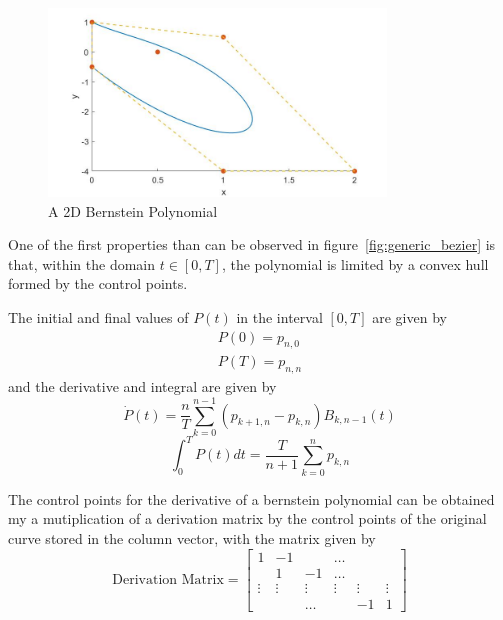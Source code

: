 \begin{figure}[h!]
\centering
\includegraphics[width=0.8\textwidth]{Images/generic_bezier2D_reordered.jpg}
\caption{A 2D Bernstein Polynomial}
\label{fig:generic_bezier2D_reordered}
\end{figure}


\par One of the first properties than can be observed in figure~\ref{fig:generic_bezier} is that, within the domain $t \in [0,T]$, the polynomial is limited by a convex hull formed by the control points.

\par The initial and final values of $P(t)$ in the interval $[0,T]$ are given by
\begin{equation}
    \label{eq:bern_in_fin}
    \begin{gathered}
        P(0) = p_{n,0} \\
        P(T) = p_{n,n}
    \end{gathered}
\end{equation}
and the derivative and integral are given by 
\begin{equation}
    \label{eq:bern_deriv}
    \dot{P}(t) = \frac{n}{T} \sum_{k=0}^{n-1} (p_{k+1,n} - p_{k,n}) B_{k,n-1}(t)
\end{equation}
\begin{equation}
    \label{eq:bern_int}
    \int_0^T P(t)dt = \frac{T}{n+1} \sum_{k=0}^{n} p_{k,n}
\end{equation}

\par The control points for the derivative of a bernstein polynomial can be obtained my a mutiplication of a derivation matrix by the control points of the original curve stored in the column vector, with the matrix given by 
\begin{equation}
    \text{Derivation Matrix} = 
    \begin{bmatrix}
        1 & -1 & & \ldots & & \\
        & 1 & -1 & \ldots & & \\
        \vdots &  \vdots & \vdots & \vdots & \vdots & \vdots  \\
        & & \ldots & & -1 & 1
    \end{bmatrix}
\end{equation}

